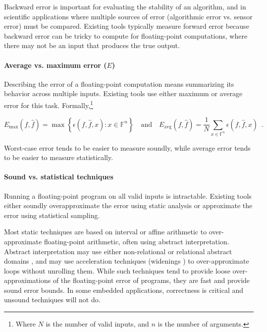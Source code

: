 \documentclass[main.tex]{subfiles}
\begin{document}
Backward error is important for evaluating the stability of an algorithm,
  and in scientific applications where multiple sources of error
  (algorithmic error vs. sensor error) must be compared.
Existing tools typically measure forward error
  because backward error can be tricky to compute
  for floating-point computations,
  where there may not be an input that produces the true output.

\paragraph{Average vs. maximum error ($E$)}

Describing the error of a floating-point computation
  means summarizing its behavior across multiple inputs.
Existing tools use either maximum or average error for this task.
Formally,\footnote{Where $N$ is the number of valid inputs, and $n$ is the number of arguments.}

\begin{equation*}
  E_{\text{max}}(f, \hat{f}) = \max \left\{\epsilon(f, \hat{f}, x) : x \in \mathbb{F}^n\right\}
  \quad \text{and} \quad
  E_{\text{avg}}(f, \hat{f}) = \frac{1}{N} \sum_{x\in \mathbb{F}^n} \epsilon(f, \hat{f}, x) \enspace .
\end{equation*}

Worst-case error tends to be easier to measure soundly,
  while average error tends to be easier to measure statistically.

\paragraph{Sound vs. statistical techniques}

Running a floating-point program on all valid inputs is intractable.
Existing tools
  either soundly overapproximate the error using static analysis
  or approximate the error using statistical sampling.

Most static techniques are based on interval or affine arithmetic
  to over-approximate floating-point arithmetic,
  often using abstract interpretation.
Abstract interpretation may use either non-relational \cite{Mar05}
  or relational abstract domains \cite{Cha10,GP11,AGW15},
  and may use acceleration techniques (widenings \cite{CC92})
  to over-approximate loops without unrolling them.
While such techniques tend to provide loose over-approximations
of the floating-point error of programs, they are fast and
provide sound error bounds. In some embedded applications,
correctness is critical and unsound techniques will not do.
\end{document}
